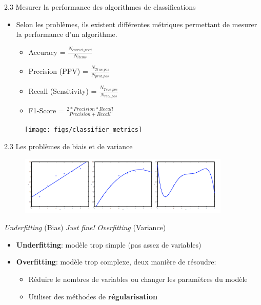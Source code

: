 \begin{frame}{2.3 Mesurer la performance des algorithmes de classifications}
  \begin{itemize}
  \item Selon les problèmes, ils existent différentes métriques permettant de mesurer la performance d'un algorithme.
    \begin{itemize}
    \item Accuracy = $\frac{N_{correct\_pred}}{N_{items}}$
    \item Precision (PPV) = $\frac{N_{True\_pos}}{N_{pred\_pos}}$
    \item Recall (Sensitivity) = $\frac{N_{True\_pos}}{N_{real\_pos}}$
    \item F1-Score =  $\frac{2*Precision*Recall}{Precision+Recall}$
    \end{itemize}
  \end{itemize}
  \begin{figure}
    \texttt{[image: figs/classifier\_metrics]}
  \end{figure}
\end{frame}

\begin{frame}{2.3 Les problèmes de biais et de variance}
  \begin{figure}
    \includegraphics[width=0.9\textwidth]{figs/theProblemOfOverfitting.png}
  \end{figure}
  \footnotesize
  \vspace{-1cm}
  \begin{center}
    \textit{Underfitting} (Bias) \hspace{1.5cm} \textit{Just fine!} \hspace{1.5cm} \textit{Overfitting} (Variance)
  \end{center}
  \begin{itemize}
  \item \textbf{Underfitting}: modèle trop simple (pas assez de variables)
  \item \textbf{Overfitting}: modèle trop complexe, deux manière de résoudre:
    \begin{itemize}
    \item Réduire le nombres de variables ou changer les paramètres du modèle
    \item Utiliser des méthodes de \textbf{régularisation}
    \end{itemize}
  \end{itemize}  
\end{frame}

